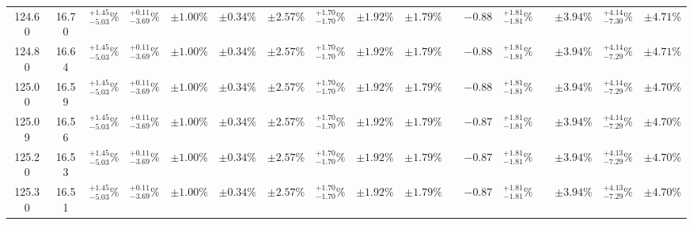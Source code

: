 \begin{landscape}
\begin{table}[ht!]
{\begin{tabular}{| cc | cccc | ccc | c |@{}c@{\;}| cc |@{}c@{\;}| ccc |}
124.60 & 16.70 & \({}^{ +1.45}_{ -5.03}\%\) & {\color{black!55}\({}^{ +0.11}_{ -3.69}\%\)} & {\color{black!55}\(\pm{  1.00}\%\)} & {\color{black!55}\(\pm{  0.34}\%\)} & \(\pm 2.57\%\) & {\color{black!55}\({}^{ +1.70}_{ -1.70}\%\)} & {\color{black!55}\(\pm 1.92\%\)} & \(\pm{  1.79}\%\) &  & \(-0.88\) & \({}^{ +1.81}_{ -1.81}\%\) &  & \(\pm 3.94\%\) & \({}^{ +4.14}_{ -7.30}\%\) & \(\pm 4.71\%\)\\
124.80 & 16.64 & \({}^{ +1.45}_{ -5.03}\%\) & {\color{black!55}\({}^{ +0.11}_{ -3.69}\%\)} & {\color{black!55}\(\pm{  1.00}\%\)} & {\color{black!55}\(\pm{  0.34}\%\)} & \(\pm 2.57\%\) & {\color{black!55}\({}^{ +1.70}_{ -1.70}\%\)} & {\color{black!55}\(\pm 1.92\%\)} & \(\pm{  1.79}\%\) &  & \(-0.88\) & \({}^{ +1.81}_{ -1.81}\%\) &  & \(\pm 3.94\%\) & \({}^{ +4.14}_{ -7.29}\%\) & \(\pm 4.71\%\)\\
125.00 & 16.59 & \({}^{ +1.45}_{ -5.03}\%\) & {\color{black!55}\({}^{ +0.11}_{ -3.69}\%\)} & {\color{black!55}\(\pm{  1.00}\%\)} & {\color{black!55}\(\pm{  0.34}\%\)} & \(\pm 2.57\%\) & {\color{black!55}\({}^{ +1.70}_{ -1.70}\%\)} & {\color{black!55}\(\pm 1.92\%\)} & \(\pm{  1.79}\%\) &  & \(-0.88\) & \({}^{ +1.81}_{ -1.81}\%\) &  & \(\pm 3.94\%\) & \({}^{ +4.14}_{ -7.29}\%\) & \(\pm 4.70\%\)\\
125.09 & 16.56 & \({}^{ +1.45}_{ -5.03}\%\) & {\color{black!55}\({}^{ +0.11}_{ -3.69}\%\)} & {\color{black!55}\(\pm{  1.00}\%\)} & {\color{black!55}\(\pm{  0.34}\%\)} & \(\pm 2.57\%\) & {\color{black!55}\({}^{ +1.70}_{ -1.70}\%\)} & {\color{black!55}\(\pm 1.92\%\)} & \(\pm{  1.79}\%\) &  & \(-0.87\) & \({}^{ +1.81}_{ -1.81}\%\) &  & \(\pm 3.94\%\) & \({}^{ +4.14}_{ -7.29}\%\) & \(\pm 4.70\%\)\\
125.20 & 16.53 & \({}^{ +1.45}_{ -5.03}\%\) & {\color{black!55}\({}^{ +0.11}_{ -3.69}\%\)} & {\color{black!55}\(\pm{  1.00}\%\)} & {\color{black!55}\(\pm{  0.34}\%\)} & \(\pm 2.57\%\) & {\color{black!55}\({}^{ +1.70}_{ -1.70}\%\)} & {\color{black!55}\(\pm 1.92\%\)} & \(\pm{  1.79}\%\) &  & \(-0.87\) & \({}^{ +1.81}_{ -1.81}\%\) &  & \(\pm 3.94\%\) & \({}^{ +4.13}_{ -7.29}\%\) & \(\pm 4.70\%\)\\
125.30 & 16.51 & \({}^{ +1.45}_{ -5.03}\%\) & {\color{black!55}\({}^{ +0.11}_{ -3.69}\%\)} & {\color{black!55}\(\pm{  1.00}\%\)} & {\color{black!55}\(\pm{  0.34}\%\)} & \(\pm 2.57\%\) & {\color{black!55}\({}^{ +1.70}_{ -1.70}\%\)} & {\color{black!55}\(\pm 1.92\%\)} & \(\pm{  1.79}\%\) &  & \(-0.87\) & \({}^{ +1.81}_{ -1.81}\%\) &  & \(\pm 3.94\%\) & \({}^{ +4.13}_{ -7.29}\%\) & \(\pm 4.70\%\)\\

\end{tabular}}
\end{table}
\end{landscape}
